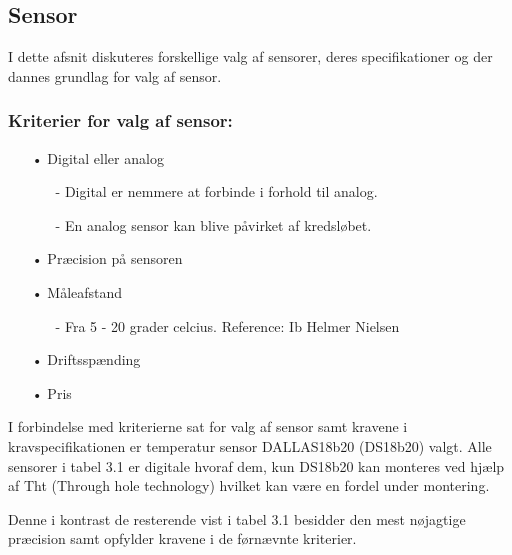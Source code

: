 \subsection{Sensor}
I dette afsnit diskuteres forskellige valg af sensorer, deres specifikationer og der dannes grundlag for valg af sensor. \newline

\subsubsection{Kriterier for valg af sensor:} 
\begin{enumerate}
	\item[•]Digital eller analog
	    \begin{enumerate}
	        \item[-]Digital er nemmere at forbinde i forhold til analog.
	        \item[-]En analog sensor kan blive påvirket af kredsløbet.
	    \end{enumerate}	
	
	\item[•]Præcision på sensoren 
	\item[•]Måleafstand
		\begin{enumerate}
			\item[-]Fra 5 - 20 grader celcius. Reference: Ib Helmer Nielsen
		\end{enumerate}	
	\item[•]Driftsspænding
	\item[•]Pris
\end{enumerate} 

I forbindelse med kriterierne sat for valg af sensor samt kravene i kravspecifikationen er temperatur sensor DALLAS18b20 (DS18b20) valgt. Alle sensorer i tabel 3.1 er digitale hvoraf dem, kun DS18b20 kan monteres ved hjælp af Tht (Through hole technology) hvilket kan være en fordel under montering.  

Denne i kontrast de resterende vist i tabel 3.1 besidder den mest nøjagtige præcision samt opfylder kravene i de førnævnte kriterier.   


